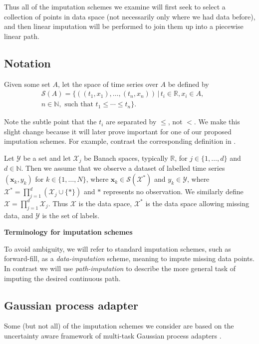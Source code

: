 \documentclass{article}
\renewcommand{\subsubsection}[1]{\textbf{#1}

} %
\newcommand{\reals}{\mathbb{R}}
\newcommand{\naturals}{\mathbb{N}}
\newcommand{\dataspace}{\mathcal{X}}
\newcommand{\lspace}{\mathcal{Y}}
\newcommand{\seriesspace}{\mathcal{S}}
\begin{document}
Thus all of the imputation schemes we examine will first seek to select a collection of points in data space (not necessarily only where we had data before), and then linear imputation will be performed to join them up into a piecewise linear path.

\subsection{Notation}
Given some set $A$, let the space of time series over $A$ be defined by
\begin{align*}
    \seriesspace(A) = \{((t_1, x_1), \ldots, (t_n, x_n)) \,\vert\, t_i \in \reals, x_i \in A,\qquad \\
    n \in \naturals, \text{ such that } t_1 \leq \cdots \leq t_n\}.
\end{align*}

Note the subtle point that the $t_i$ are separated by $\leq$, not $<$. We make this slight change because it will later prove important for one of our proposed imputation schemes. For example, contrast the corresponding definition in \citep[Section 1]{toth2019gp}.

Let $\lspace$ be a set and let $\dataspace_j$ be Banach spaces, typically $\reals$, for $j \in \{1, \ldots, d\}$ and $d \in \naturals$. Then we assume that we observe a dataset of labelled time series $(\mathbf{x}_k, y_k)$ for $k \in \{1, \ldots, N\}$, where $\mathbf{x}_k \in \seriesspace(\dataspace^*)$ and $y_k \in \lspace$, where $\dataspace^* = \prod_{j = 1}^d(\dataspace_j \cup \{*\})$ and $*$ represents no observation. We similarly define
$\dataspace = \prod_{j = 1}^d\dataspace_j.$ Thus $\dataspace$ is the data space, $\dataspace^*$ is the data space allowing missing data, and $\lspace$ is the set of labels.

\subsubsection{Terminology for imputation schemes}
To avoid ambiguity, we will refer to standard imputation schemes, such as forward-fill, as a \emph{data-imputation} scheme, meaning to impute missing data points. In contrast we will use \emph{path-imputation} to describe the more general task of imputing the desired continuous path.

\subsection{Gaussian process adapter}\label{section:gpadapter}
Some (but not all) of the imputation schemes we consider are based on the uncertainty aware framework of multi-task Gaussian process adapters \citep{li2016scalable, futoma2017mgp}.
\end{document}
